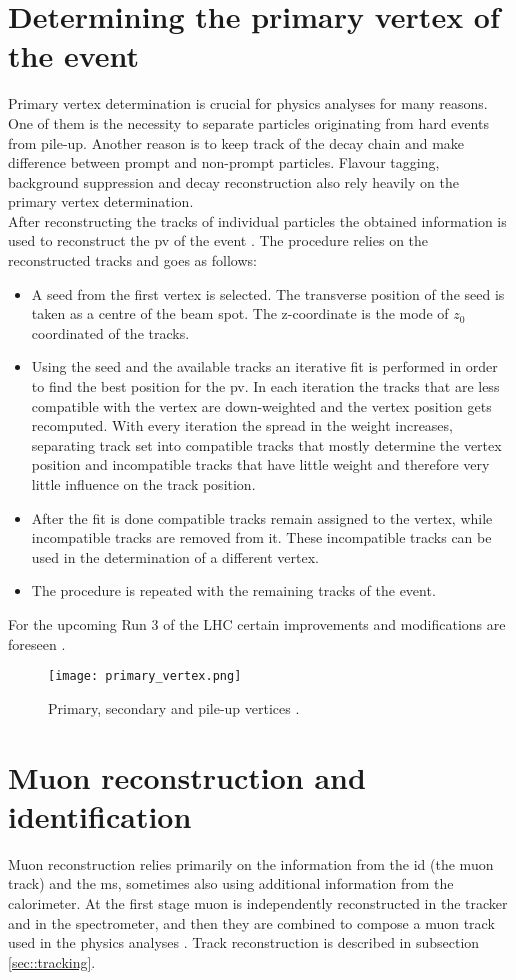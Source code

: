   \section{Determining the primary vertex of the event}
   Primary vertex determination is crucial for physics analyses for many  reasons. One of them is the necessity to separate particles originating from hard events from pile-up. Another reason is to keep track of the decay chain and make difference between prompt and non-prompt particles. Flavour tagging, background suppression and decay reconstruction also rely heavily on the primary vertex determination.\\
  After reconstructing the tracks of individual particles the obtained information is used to reconstruct the \gls{pv} of the event \cite{PrimVertRun12}. The procedure relies on the reconstructed tracks and goes as follows:
  \begin{itemize}
  \item A seed from the first vertex is selected. The transverse position of the seed is taken as a centre of the beam spot. The z-coordinate is the mode of $z_0$ coordinated of the tracks.
  \item Using the seed and the available tracks an iterative fit is performed in order to find the best position for the \gls{pv}. In each iteration the tracks that are less compatible with the vertex are down-weighted and the vertex position gets recomputed. With every iteration the spread in the weight increases, separating track set into compatible tracks that mostly determine the vertex position and incompatible tracks that have little weight and therefore very little influence on the track position. 
  \item After the fit is done compatible tracks remain assigned to the vertex, while incompatible tracks are removed from it. These incompatible tracks can be used in the determination of a different vertex.
  \item The procedure is repeated with the remaining tracks of the event.
  \end{itemize}  
  For the upcoming Run 3 of the LHC certain improvements and modifications are foreseen \cite{PrimVertRun3}.
  \begin{figure}[htbp]
  	\centering
  	\texttt{[image: primary\_vertex.png]}
  	\caption[Vertices]{Primary, secondary and pile-up vertices \cite{vert_recon}.}
  	\label{fig::pv}
  \end{figure}
    \section{Muon reconstruction and identification}
    Muon reconstruction relies primarily on the information from the \gls{id} (the muon track) and the \gls{ms}, sometimes also using additional information from the calorimeter. At the first stage muon is independently reconstructed in the tracker and in the spectrometer, and then they are combined to compose a muon track used in the physics analyses \cite{muons_reco1}. Track reconstruction is described in subsection \ref{sec::tracking}. 

